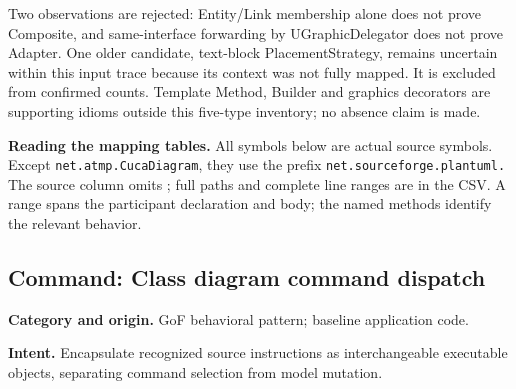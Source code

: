 \documentclass[11pt,a4paper]{article}
\begin{document}
Two observations are rejected: Entity/Link membership alone does not prove
Composite, and same-interface forwarding by UGraphicDelegator does not prove
Adapter. One older candidate, text-block PlacementStrategy, remains uncertain
within this input trace because its context was not fully mapped. It is excluded
from confirmed counts. Template Method, Builder and graphics decorators are
supporting idioms outside this five-type inventory; no absence claim is made.

\textbf{Reading the mapping tables.} All symbols below are actual source symbols.
Except \texttt{net.atmp.CucaDiagram}, they use the prefix
\texttt{net.sourceforge.plantuml.} The source column omits
; full paths and complete
line ranges are in the CSV. A range spans the participant declaration and body;
the named methods identify the relevant behavior.

\clearpage
\subsection{Command: Class diagram command dispatch}
\textbf{Category and origin.} GoF behavioral pattern; baseline application code.

\textbf{Intent.} Encapsulate recognized source instructions as interchangeable executable objects, separating command selection from model mutation.
\end{document}
